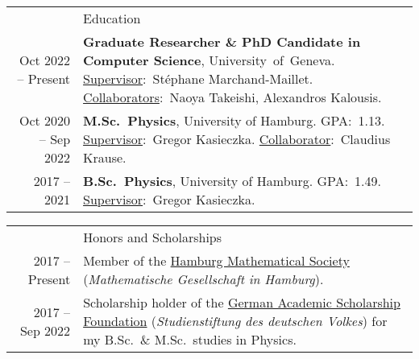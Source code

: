 \documentclass[11pt, a4paper]{article}
\newcommand{\headingfont}{\Large\color{OliveGreen}}
\newenvironment{SectionTable}[1]{
	\renewcommand*{\arraystretch}{1.7}
	\setlength{\tabcolsep}{10pt}
	\begin{longtable}{Rp{5.2in}} & #1 \\}
	{\end{longtable}\vspace{-.3cm}}
\newenvironment{SectionTableSingleSpace}[1]{
	\renewcommand*{\arraystretch}{1.2}
	\setlength{\tabcolsep}{10pt}
	\begin{longtable}{Rp{5.2in}} & #1 \\[0.6em]}
	{\end{longtable}\vspace{-.3cm}}
\begin{document}
	\begin{SectionTable}{\headingfont Education} 
		
		Oct 2022 -- Present & \textbf{Graduate Researcher \& PhD Candidate in Computer Science}, \mbox{University of Geneva}. \newline
		\underline{Supervisor}:~Stéphane Marchand-Maillet. \newline 
		\underline{Collaborators}:~Naoya Takeishi, Alexandros Kalousis.
		\\
		
		Oct 2020 -- Sep 2022 & 
		\textbf{M.Sc.~Physics}, University of Hamburg. GPA:~1.13. \newline
		\underline{Supervisor}:~Gregor Kasieczka. \newline 
		\underline{Collaborator}:~Claudius Krause.
		\\
		
		2017 -- 2021 & 
		\textbf{B.Sc.~Physics}, University of Hamburg. GPA:~1.49. \newline
		\underline{Supervisor}:~Gregor Kasieczka.
		\\ 

		
		
		
	\end{SectionTable}
	
	
	\begin{SectionTableSingleSpace}{\headingfont Honors and Scholarships}
		2017 -- Present & 
		Member of the \href{https://www.mathges.hamburg/Veranstaltungen.html}{Hamburg Mathematical Society} (\textit{Mathematische Gesellschaft in Hamburg}). \\ 
		
		2017 -- Sep 2022 & 
		Scholarship holder of the \href{https://www.studienstiftung.de/en/}{German Academic Scholarship Foundation} (\textit{\mbox{Studienstiftung} des deutschen Volkes}) 
        for my B.Sc.~\& M.Sc.~studies in Physics. %
	\end{SectionTableSingleSpace}
	
\end{document}

